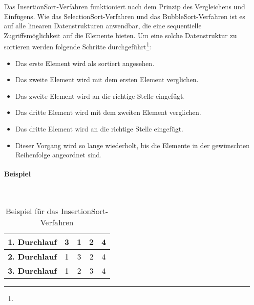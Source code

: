\documentclass[./entry.tex]{subfiles}
\begin{document}
    Das \dq InsertionSort\dq-Verfahren funktioniert nach dem Prinzip des \dq Vergleichens und Einfügens\dq.
    Wie das \dq SelectionSort\dq-Verfahren und das \dq BubbleSort\dq-Verfahren ist es auf alle linearen Datenstrukturen anwendbar,
    die eine sequentielle Zugriffsmöglichkeit auf die Elemente bieten.
    Um eine solche Datenstruktur zu sortieren werden folgende Schritte durchgeführt\footnote{}:
    \begin{itemize}
        \item Das erste Element wird als sortiert angesehen.
        \item Das zweite Element wird mit dem ersten Element verglichen.
        \item Das zweite Element wird an die richtige Stelle eingefügt.
        \item Das dritte Element wird mit dem zweiten Element verglichen.
        \item Das dritte Element wird an die richtige Stelle eingefügt.
        \item Dieser Vorgang wird so lange wiederholt, bis die Elemente in der gewünschten Reihenfolge angeordnet sind.
    \end{itemize}

    \paragraph{Beispiel} \mbox{}\\

    \begin{table}[h]
        \centering
        \begin{tabular}{|c|c|c|c|c|}
            \hline
            \textbf{1. Durchlauf} & 3 & {\color{red}1} & 2 & 4 \\
            \hline
            \textbf{2. Durchlauf} & 1 & 3 & {\color{red}2} & 4 \\
            \hline
            \textbf{3. Durchlauf} & 1 & 2 & 3 & 4 \\
            \hline
        \end{tabular}
        \caption{Beispiel für das \dq InsertionSort\dq-Verfahren}
        \label{tab:insertionsort}
    \end{table}
\end{document}
